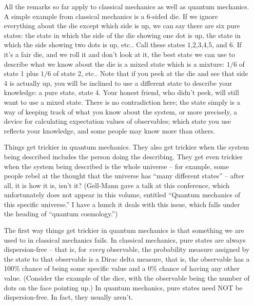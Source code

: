\documentclass[12pt]{article}
\begin{document}
All the remarks so far apply to classical mechanics as well as quantum
mechanics. A simple example from classical mechanics is a 6-sided die.
If we ignore everything about the die except which side is up, we can
say there are six pure states: the state in which the side of the die
showing one dot is up, the state in which the side showing two dots is
up, etc.. Call these states 1,2,3,4,5, and 6. If it's a fair die, and we
roll it and don't look at it, the best state we can use to describe what
we know about the die is a mixed state which is a mixture: \(1/6\) of
state 1 plus \(1/6\) of state 2, etc.. Note that if you peek at the die
and see that side 4 is actually up, you will be inclined to use a
different state to describe your knowledge: a pure state, state 4. Your
honest friend, who didn't peek, will still want to use a mixed state.
There is no contradiction here; the state simply is a way of keeping
track of what you know about the system, or more precisely, a device for
calculating expectation values of observables; which state you use
reflects your knowledge, and some people may know more than others.

Things get trickier in quantum mechanics. They also get trickier when
the system being described includes the person doing the describing.
They get even trickier when the system being described is the whole
universe -- for example, some people rebel at the thought that the
universe has ``many different states'' -- after all, it is how it is,
isn't it? (Gell-Mann gave a talk at this conference, which unfortunately
does not appear in this volume, entitled ``Quantum mechanics of this
specific universe.'' I have a hunch it deals with this issue, which
falls under the heading of ``quantum cosmology.'')

The first way things get trickier in quantum mechanics is that something
we are used to in classical mechanics fails. In classical mechanics,
pure states are always dispersion-free -- that is, for \emph{every}
observable, the probability measure assigned by the state to that
observable is a Dirac delta measure, that is, the observable has a 100\%
chance of being some specific value and a 0\% chance of having any other
value. (Consider the example of the dice, with the observable being the
number of dots on the face pointing up.) In quantum mechanics, pure
states need NOT be dispersion-free. In fact, they usually aren't.
\end{document}
